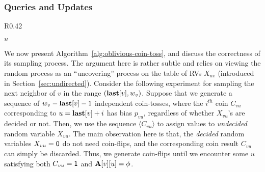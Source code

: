 \subsubsection{Queries and Updates}
\label{sec:nn-correctness}
\begin{wrapfigure}[14]{R}{0.42\textwidth}
\vspace{-1em}
\begin{framed}
    \renewcommand\figurename{Algorithm}
    \caption{Sampling }
    \label{alg:oblivious-coin-toss}
    \begin{algorithmic}[1]
            \State{$w_v \gets \min \{(P_v \cap (u, n]) \cup \{n+1\}\}$}
            \Repeat
            \EndIf
            \State \Return $u$
        \EndProcedure
    \end{algorithmic}
\end{framed}
\end{wrapfigure}
We now present Algorithm~\ref{alg:oblivious-coin-toss}, and discuss the correctness of its sampling process.
The argument here is rather subtle and relies on viewing the random process as an ``uncovering'' process on the table of RVs $X_{uv}$
(introduced in Section~\ref{sec:undirected}).
Consider the following experiment for sampling the next neighbor of $v$ in the range $(\mathbf{last}[v],w_v)$.
Suppose that we generate a sequence of $w_v-\mathbf{last}[v]-1$ independent coin-tosses,
where the $i^{th}$ coin $C_{vu}$ corresponding to $u = \mathbf{last}[v]+i$ has bias $p_{vu}$, regardless of whether $X_{vu}$'s are decided or not.
Then, we use the sequence $\langle C_{vu} \rangle$ to assign values to \emph{undecided} random variable $X_{vu}$.
The main observation here is that, the \emph{decided} random variables $X_{vu} = \mathsf{0}$ do not need coin-flips,
and the corresponding coin result $C_{vu}$ can simply be discarded.
Thus, we generate coin-flips until we encounter some $u$ satisfying both $C_{vu} = \mathsf{1}$ and $\mathbf{A}[v][u] = \phi$.

